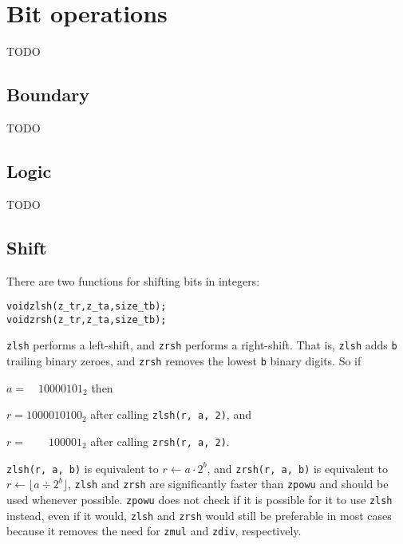 \chapter{Bit operations}
\label{chap:Bit operations}

TODO

\vspace{1cm}
\minitoc


\newpage
\section{Boundary}
\label{sec:Boundary}

TODO %


\newpage
\section{Logic}
\label{sec:Logic}

TODO %


\newpage
\section{Shift}
\label{sec:Shift}

There are two functions for shifting bits
in integers:

\begin{alltt}
   void zlsh(z_t r, z_t a, size_t b);
   void zrsh(z_t r, z_t a, size_t b);
\end{alltt}

\noindent
{\tt zlsh} performs a left-shift, and {\tt zrsh}
performs a right-shift. That is, {\tt zlsh} adds
{\tt b} trailing binary zeroes, and {\tt zrsh}
removes the lowest {\tt b} binary digits. So if

$a = \phantom{00}10000101_2$ then

$r = 1000010100_2$ after calling {\tt zlsh(r, a, 2)}, and

$r = \phantom{0100}100001_2$ after calling {\tt zrsh(r, a, 2)}.
\vspace{1em}

{\tt zlsh(r, a, b)} is equivalent to $r \gets a \cdot 2^b$,
and {\tt zrsh(r, a, b)} is equivalent to
$r \gets \lfloor a \div 2^b \rfloor$, {\tt zlsh} and
{\tt zrsh} are significantly faster than {\tt zpowu}
and should be used whenever possible. {\tt zpowu}
does not check if it is possible for it to use {\tt zlsh}
instead, even if it would, {\tt zlsh} and {\tt zrsh}
would still be preferable in most cases because it
removes the need for {\tt zmul} and {\tt zdiv},
respectively.

